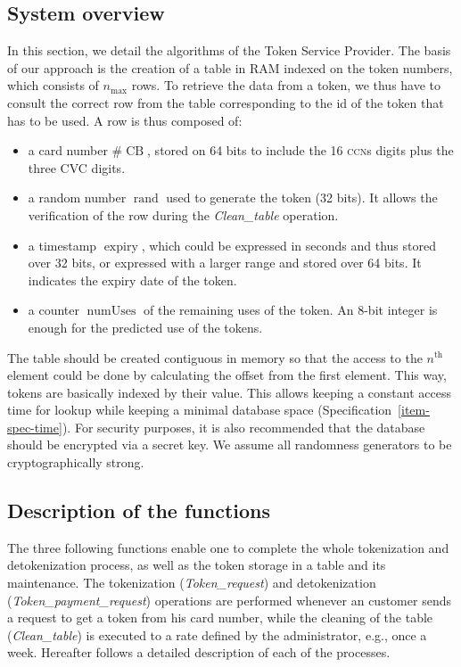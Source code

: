 \documentclass{llncs}
\DeclareMathOperator{\numUses}{numUses}
\DeclareMathOperator{\CB}{CB}
\DeclareMathOperator{\expiry}{expiry}
\DeclareMathOperator{\rand}{rand}
\begin{document}
\subsection{System overview}

In this section, we detail the algorithms of the Token Service Provider. The basis of our approach is the creation of a table in RAM indexed on the token numbers, which consists of $n_{\max}$ rows. To retrieve the data from a token, we thus have to consult the correct row from the table corresponding to the id of the token that has to be used. A row is thus composed of:
\begin{itemize}
    \item a card number $\#\CB$, stored on 64 bits to include the 16 \textsc{ccn}s digits plus the three \textsc{CVC} digits.
    \item a random number $\rand$ used to generate the token (32 bits). It allows the verification of the row during the \textit{Clean\_table} operation.
    \item a timestamp $\expiry$, which could be expressed in seconds and thus stored over 32 bits, or expressed with a larger range and stored over 64 bits. It indicates the expiry date of the token.
    \item a counter $\numUses$ of the remaining uses of the token. An 8-bit integer is enough for the predicted use of the tokens.
\end{itemize}

The table should be created contiguous in memory so that the access to the $n^\text{th}$ element could be done by calculating the offset from the first element. This way, tokens are basically indexed by their value. This allows keeping a constant access time for lookup while keeping a minimal database space (Specification~\ref{item-spec-time}). For security purposes, it is also recommended that the database should be encrypted via a secret key. We assume all randomness generators to be cryptographically strong.

\subsection{Description of the functions}

The three following functions enable one to complete the whole tokenization and detokenization process, as well as the token storage in a table and its maintenance. The tokenization (\textit{Token\_request}) and detokenization (\textit{Token\_payment\_request}) operations are performed whenever an customer sends a request to get a token from his card number, while the cleaning of the table (\textit{Clean\_table}) is executed to a rate defined by the administrator, e.g., once a week. Hereafter follows a detailed description of each of the processes.
\end{document}
